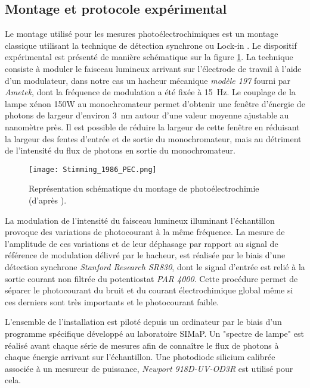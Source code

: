 \begin{refsection}
    \subsection{Montage et protocole expérimental}\label{subsec:ch3_experimentals}

    Le montage utilisé pour les mesures photoélectrochimiques est un
    montage classique utilisant la technique de détection synchrone ou Lock-in \citep{Stimming1986}. 
    Le dispositif expérimental est présenté de manière schématique sur la figure \ref{fig:ch3_PEC_schematics}.
    La technique consiste à moduler le faisceau lumineux arrivant sur l’électrode de travail à l'aide d'un modulateur,
    dans notre cas un hacheur mécanique \emph{modèle 197} fourni par \emph{Ametek}, 
    dont la fréquence de modulation a été fixée à \SI{15}{\hertz}.
    Le couplage de la lampe xénon 150W au monochromateur permet d’obtenir
    une fenêtre d'énergie de photons de largeur d'environ 3~nm autour d’une valeur moyenne
    ajustable au nanomètre près. Il est possible de réduire la largeur de cette fenêtre en réduisant la largeur des
    fentes d'entrée et de sortie du monochromateur, mais au détriment de l'intensité du flux de photons en sortie du
    monochromateur.

    \begin{figure}[H]
        \centering
        \texttt{[image: Stimming\_1986\_PEC.png]}
        \caption[Représentation schématique d'un montage typique de photoélectrochimie.]
        {Représentation schématique du montage de photoélectrochimie (d'après \citet{Stimming1986}).}
       \label{fig:ch3_PEC_schematics}
    \end{figure}

    La modulation de l'intensité du faisceau lumineux illuminant l'échantillon provoque des variations de photocourant 
    à la même fréquence. La mesure de l’amplitude de ces variations et de leur déphasage par rapport
    au signal de référence de modulation délivré par le hacheur, est réalisée par le biais d’une détection
    synchrone \emph{Stanford Research SR830}, dont le signal d’entrée est relié à la sortie courant non
    filtrée du potentiostat \emph{PAR 4000}. Cette procédure permet de séparer le photocourant du bruit et du courant
    électrochimique global même si ces derniers sont très importants et le photocourant faible.

    L'ensemble de l’installation est piloté depuis un ordinateur par le biais d’un
    programme spécifique développé au laboratoire SIMaP. Un "spectre de lampe" est réalisé avant
    chaque série de mesures afin de connaître le flux de photons à chaque énergie arrivant sur l'échantillon.
    Une photodiode silicium calibrée associée à un mesureur de puissance, \emph{Newport 918D-UV-OD3R} est
    utilisé pour cela.


\end{refsection}
